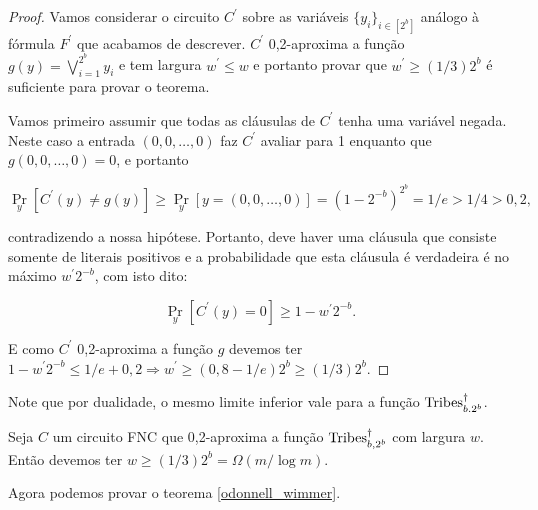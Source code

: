 \begin{proof}

Vamos considerar o circuito $C^{\prime}$ sobre as variáveis $\{y_{i}\}_{i \in [2^{b}]}$ análogo à fórmula $F^{\prime}$ que acabamos de descrever. $C^{\prime}$ 0,2-aproxima a função $g(y) = \bigvee_{i = 1}^{2^{b}} y_{i}$ e tem largura $w^{\prime} \leq w$ e portanto provar que $w^{\prime} \geq (1/3)2^{b}$ é suficiente para provar o teorema.

Vamos primeiro assumir que todas as cláusulas de $C^{\prime}$ tenha uma variável negada. Neste caso a entrada $(0, 0, \dots, 0)$ faz $C^{\prime}$ avaliar para 1 enquanto que $g(0, 0, \dots, 0) = 0$, e portanto

\begin{equation*}
	\Pr_{y}[C^{\prime}(y) \neq g(y)] \geq \Pr_{y}[y = (0, 0, \dots, 0)] = (1 - 2^{-b})^{2^{b}} = 1/e > 1/4 > 0,2,
\end{equation*}

contradizendo a nossa hipótese. Portanto, deve haver uma cláusula que consiste somente de literais positivos e a probabilidade que esta cláusula é verdadeira é no máximo $w^{\prime}2^{-b}$, com isto dito:

\begin{equation*}
	\Pr_{y}[C^{\prime}(y) = 0] \geq 1 - w^{\prime}2^{-b}.
\end{equation*}

E como $C^{\prime}$ 0,2-aproxima a função $g$ devemos ter $1 - w^{\prime}2^{-b} \leq 1/e + 0,2 \Rightarrow w^{\prime} \geq (0,8 - 1/e)2^{b} \geq (1/3)2^{b}$.

\end{proof}

Note que por dualidade, o mesmo limite inferior vale para a função $\text{Tribes}_{b. 2^{b}}^{\dagger}$.

\begin{cor} \label{tribes_dagger_width_lb}

Seja $C$ um circuito FNC que 0,2-aproxima a função $\text{Tribes}_{b, 2^{b}}^{\dagger}$ com largura $w$. Então devemos ter $w \geq (1/3)2^{b} = \Omega(m/ \log m)$.

\end{cor}

Agora podemos provar o teorema \ref{odonnell_wimmer}.

